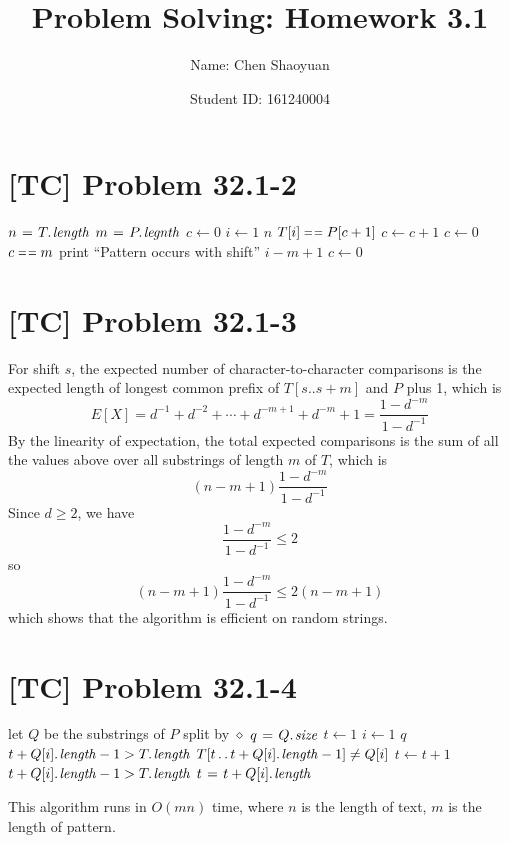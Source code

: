 \documentclass[a4paper,11pt,twocolumn]{article}
\newcommand{\homeworkno}{3.1}
\begin{document}
  \title{Problem Solving: Homework \homeworkno}
  \author{Name: Chen Shaoyuan \and Student ID: 161240004}
  \maketitle

  \section{[TC] Problem 32.1-2}
  \begin{codebox}
  \li $n \gets \attrib{T}{length}$
  \li $m \gets \attrib{P}{legnth}$
  \li $c \gets 0$
  \li \For $i \gets 1$ \To $n$
  \li \Do  \If $T[i] \isequal P[c+1]$
  \li      \Do $c \gets c + 1$
  \li      \Else
  \li          $c \gets 0$
           \End
  \li      \If $c \isequal m$
  \li      \Do print ``Pattern occurs with shift'' $i-m+1$
  \li          $c \gets 0$
           \End
       \End
  \end{codebox}
  
  \section{[TC] Problem 32.1-3}
  For shift $s$, the expected number of character-to-character comparisons is the expected length of longest common prefix of $T[s..s+m]$ and $P$ plus 1, which is
  $$ E[X] = d^{-1} + d^{-2} + \cdots + d^{-m+1} + d^{-m} + 1 = \frac{1-d^{-m}}{1-d^{-1}}$$
  By the linearity of expectation, the total expected comparisons is the sum of all the values above over all substrings of length $m$ of $T$, which is
  $$ (n-m+1) \frac{1-d^{-m}}{1-d^{-1}} $$
  Since $d \geq 2$, we have 
  $$\frac{1-d^{-m}}{1-d^{-1}} \leq 2$$
  so
  $$ (n-m+1) \frac{1-d^{-m}}{1-d^{-1}} \leq 2(n-m+1) $$
  which shows that the algorithm is efficient on random strings.
  
  \section{[TC] Problem 32.1-4}
  \begin{codebox}
  \li let $Q$ be the substrings of $P$ split by $\diamond$
  \li $q \gets \attrib{Q}{size}$
  \li $t \gets 1$
  \li \For $i \gets 1$ \To $q$
  \li \Do \If $t + \attrib{Q[i]}{length} - 1 > \attrib{T}{length}$
  \li     \Do \Return {}
          \End
  \li     \While $T[t \twodots t + \attrib{Q[i]}{length} - 1] \neq Q[i]$
  \li     \Do $t \gets t + 1$
  \li         \If $t + \attrib{Q[i]}{length} - 1 > \attrib{T}{length}$
  \li         \Do \Return {}
              \End
          \End
  \li     $t \gets t + \attrib{Q[i]}{length}$

      \End
  \li \Return {}
  \end{codebox}
  This algorithm runs in $O(mn)$ time, where $n$ is the length of text, $m$ is the length of pattern.
  
\end{document}
